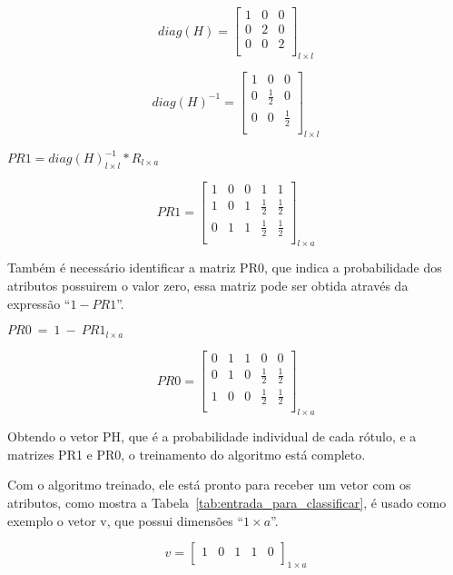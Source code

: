 \begin{anexosenv}
$$diag(H)=\left[
\begin{array}{ccc}
1 & 0 & 0 \\
0 & 2 & 0 \\
0 & 0 & 2 \\
\end{array}
\right]_{l \times l}$$

$$diag(H)^{-1}=\left[
\begin{array}{ccc}
1 & 0 & 0 \\
0 & \frac{1}{2} & 0 \\
0 & 0 & \frac{1}{2} \\
\end{array}
\right]_{l \times l}$$

\begin{center}
$PR1 = diag(H)^{-1}_{l \times l} * R_{l \times a}$
\end{center}

$$PR1=\left[
\begin{array}{ccccc}
1 & 0 & 0 & 1 & 1 \\
1 & 0 & 1 & \frac{1}{2} & \frac{1}{2} \\
0 & 1 & 1 & \frac{1}{2} & \frac{1}{2} \\
\end{array}
\right]_{l \times a}$$

Também é necessário identificar a matriz PR0, que indica a probabilidade dos
atributos possuirem o valor zero, essa matriz pode ser obtida através da
expressão ``$1 - PR1$''.

\begin{center}
$PR0 \ = \ 1 \ - \ PR1_{l \times a}$
\end{center}

$$PR0=\left[
\begin{array}{ccccc}
0 & 1 & 1 & 0 & 0 \\
0 & 1 & 0 & \frac{1}{2} & \frac{1}{2} \\
1 & 0 & 0 & \frac{1}{2} & \frac{1}{2} \\
\end{array}
\right]_{l \times a}$$

Obtendo o vetor PH, que é a probabilidade individual de cada rótulo, e a
matrizes PR1 e PR0, o treinamento do algoritmo está completo.

Com o algoritmo treinado, ele está pronto para receber um vetor com
os atributos, como mostra a Tabela~\ref{tab:entrada_para_classificar},
é usado como exemplo o vetor v, que possui dimensões ``${1 \times a}$''.

$$v=\left[
\begin{array}{ccccc}
1 & 0 & 1 & 1 & 0 \\
\end{array}
\right]_{1 \times a}$$


\end{anexosenv}
